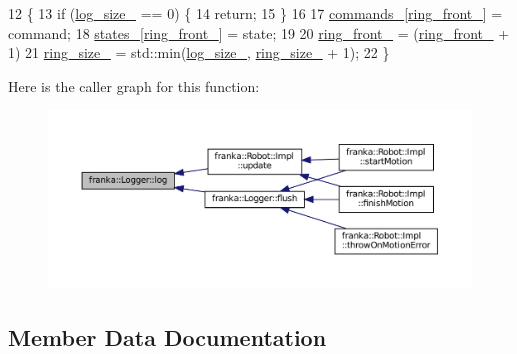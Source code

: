 \begin{DoxyCode}
12                                                                                             \{
13   \textcolor{keywordflow}{if} (\hyperlink{classfranka_1_1Logger_ac4d8294e724b3e1ada3ddbcdfc14e245}{log\_size\_} == 0) \{
14     \textcolor{keywordflow}{return};
15   \}
16 
17   \hyperlink{classfranka_1_1Logger_acbc69d24663395732ac72d274146eb5f}{commands\_}[\hyperlink{classfranka_1_1Logger_ac8b62b201f384202b095b68babe0a8da}{ring\_front\_}] = command;
18   \hyperlink{classfranka_1_1Logger_aea60d37797979d786e7653168cf49ecb}{states\_}[\hyperlink{classfranka_1_1Logger_ac8b62b201f384202b095b68babe0a8da}{ring\_front\_}] = state;
19 
20   \hyperlink{classfranka_1_1Logger_ac8b62b201f384202b095b68babe0a8da}{ring\_front\_} = (\hyperlink{classfranka_1_1Logger_ac8b62b201f384202b095b68babe0a8da}{ring\_front\_} + 1) %
21   \hyperlink{classfranka_1_1Logger_ab70ce51d314081d2f467a6dfbf1f80a4}{ring\_size\_} = std::min(\hyperlink{classfranka_1_1Logger_ac4d8294e724b3e1ada3ddbcdfc14e245}{log\_size\_}, \hyperlink{classfranka_1_1Logger_ab70ce51d314081d2f467a6dfbf1f80a4}{ring\_size\_} + 1);
22 \}
\end{DoxyCode}
Here is the caller graph for this function\+:
\nopagebreak
\begin{figure}[H]
\begin{center}
\leavevmode
\includegraphics[width=350pt]{classfranka_1_1Logger_aee4bfea6a4081c4ed9ee2abd2f62a0cd_icgraph}
\end{center}
\end{figure}


\subsection{Member Data Documentation}
\mbox{\label{classfranka_1_1Logger_acbc69d24663395732ac72d274146eb5f}} 
